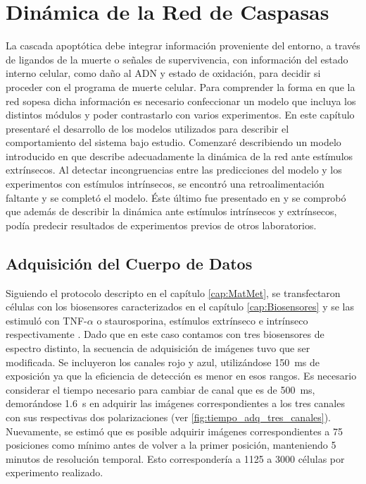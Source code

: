 \chapter{Dinámica de la Red de Caspasas}
\label{cap:Modelos}


La cascada apoptótica debe integrar información proveniente del entorno, a través de ligandos de la muerte o señales de supervivencia, con información del estado interno celular, como daño al ADN y estado de oxidación, para decidir si proceder con el programa de muerte celular. Para comprender la forma en que la red sopesa dicha información es necesario confeccionar un modelo que incluya los distintos módulos y poder contrastarlo con varios experimentos. En este capítulo presentaré el desarrollo de los modelos utilizados para describir el comportamiento del sistema bajo estudio. Comenzaré describiendo un modelo introducido en \cite{Corbat2018} que describe adecuadamente la dinámica de la red ante estímulos extrínsecos. Al detectar incongruencias entre las predicciones del modelo y los experimentos con estímulos intrínsecos, se encontró una retroalimentación faltante y se completó el modelo. Éste último fue presentado en \cite{Corbat2021} y se comprobó que además de describir la dinámica ante estímulos intrínsecos y extrínsecos, podía predecir resultados de experimentos previos de otros laboratorios.


\section{Adquisición del Cuerpo de Datos}


Siguiendo el protocolo descripto en el capítulo \ref{cap:MatMet}, se transfectaron células con los biosensores caracterizados en el capítulo \ref{cap:Biosensores} y se las estimuló con TNF-$\alpha$ o staurosporina, estímulos extrínseco e intrínseco respectivamente \citep{Sakamaki2009, Malsy2019}. Dado que en este caso contamos con tres biosensores de espectro distinto, la secuencia de adquisición de imágenes tuvo que ser modificada. Se incluyeron los canales rojo y azul, utilizándose 150~ms de exposición ya que la eficiencia de detección es menor en esos rangos. Es necesario considerar el tiempo necesario para cambiar de canal que es de 500~ms, demorándose 1.6~s en adquirir las imágenes correspondientes a los tres canales con sus respectivas dos polarizaciones (ver \cref{fig:tiempo_adq_tres_canales}). Nuevamente, se estimó que es posible adquirir imágenes correspondientes a 75 posiciones como mínimo antes de volver a la primer posición, manteniendo 5 minutos de resolución temporal. Esto correspondería a 1125 a 3000 células por experimento realizado.

